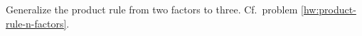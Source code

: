 Generalize the product rule from two factors to three. Cf.~problem \ref{hw:product-rule-n-factors}.
